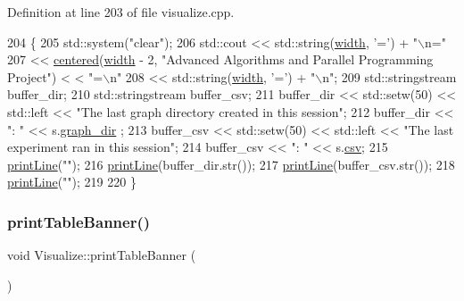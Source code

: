 Definition at line 203 of file visualize.\+cpp.


\begin{DoxyCode}
204 \{
205     std::system(\textcolor{stringliteral}{"clear"});
206     std::cout << std::string(\hyperlink{class_visualize_af5ac723ad5f8fe8c4a8378bf1299cda7}{width}, \textcolor{charliteral}{'='}) + \textcolor{stringliteral}{"\(\backslash\)n="}
207               << \hyperlink{class_visualize_a9d34d81d684587b8b2b8bf70031f1670}{centered}(\hyperlink{class_visualize_af5ac723ad5f8fe8c4a8378bf1299cda7}{width} - 2, \textcolor{stringliteral}{"Advanced Algorithms and Parallel Programming Project"}) <
      < \textcolor{stringliteral}{"=\(\backslash\)n"}
208               << std::string(\hyperlink{class_visualize_af5ac723ad5f8fe8c4a8378bf1299cda7}{width}, \textcolor{charliteral}{'='}) + \textcolor{stringliteral}{"\(\backslash\)n"};
209     std::stringstream buffer\_dir;
210     std::stringstream buffer\_csv;
211     buffer\_dir << std::setw(50) << std::left << \textcolor{stringliteral}{"The last graph directory created in this session"};
212     buffer\_dir << \textcolor{stringliteral}{": "} << s.\hyperlink{struct_session_aecaa42a56f197e0874041533ccb358a6}{graph\_dir} ;
213     buffer\_csv << std::setw(50) << std::left << \textcolor{stringliteral}{"The last experiment ran in this session"};
214     buffer\_csv << \textcolor{stringliteral}{": "} << s.\hyperlink{struct_session_a256b14530b834d61ce85bab451694b8c}{csv};
215     \hyperlink{class_visualize_abce6cd538dc0715b21851e0bf0377d85}{printLine}(\textcolor{stringliteral}{""});
216     \hyperlink{class_visualize_abce6cd538dc0715b21851e0bf0377d85}{printLine}(buffer\_dir.str());
217     \hyperlink{class_visualize_abce6cd538dc0715b21851e0bf0377d85}{printLine}(buffer\_csv.str());
218     \hyperlink{class_visualize_abce6cd538dc0715b21851e0bf0377d85}{printLine}(\textcolor{stringliteral}{""});
219 
220 \}
\end{DoxyCode}
\mbox{\label{class_visualize_a3e1aa31f14abdf3cf53662cddc536c6a}} 
\subsubsection{\texorpdfstring{print\+Table\+Banner()}{printTableBanner()}}
{\footnotesize\ttfamily void Visualize\+::print\+Table\+Banner (\begin{DoxyParamCaption}{ }\end{DoxyParamCaption})}



